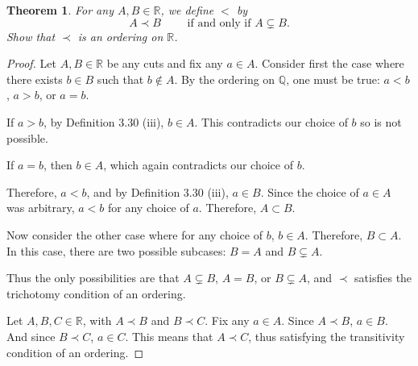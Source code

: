 \documentclass{amsart}
\newtheorem{theorem}{Theorem}
\newcommand{\Q}{\mathbb Q}
\newcommand{\R}{\mathbb R}
\newcommand{\1}{\mathds{1}}
\def \R {{\mathbb {R}}}
\numberwithin{equation}{section}
\numberwithin{theorem}{section}
\begin{document}
\begin{theorem}
	For any $A, B\in \R$, we define $<$ by
	\[
	A \prec B
	\qquad\text{ if and only if }
	A \subsetneq B.
	\]
	Show that $\prec$ is an ordering on $\R$.
\end{theorem}

\begin{proof}
	Let $A,B \in\R$ be any cuts and fix any $a\in A$. Consider first the case where there exists $b\in B$ such that $b\notin A$. By the ordering on $\Q$, one must be true: $a<b$, $a>b$, or $a=b$.
	
	If $a>b$, by Definition 3.30 (iii), $b\in A$. This contradicts our choice of $b$ so is not possible.
	
	If $a = b$, then $b\in A$, which again contradicts our choice of $b$.  
	
	Therefore, $a<b$, and by Definition 3.30 (iii), $a\in B$. Since the choice of $a\in A$ was arbitrary, $a<b$ for any choice of $a$. Therefore, $A\subset B$.
	
	Now consider the other case where for any choice of $b$, $b\in A$. Therefore, $B\subset A$. In this case, there are two possible subcases: $B=A$ and $B\subsetneq A$.
	
	Thus the only possibilities are that $A\subsetneq B$, $A = B$, or $B\subsetneq A$, and $\prec$ satisfies the trichotomy condition of an ordering.
	
	Let $A,B,C\in \R$, with $A\prec B$ and $B\prec C$. Fix any $a\in A$. Since $A\prec B$, $a\in B$. And since $B\prec C$, $a\in C$. This means that $A\prec C$, thus satisfying the transitivity condition of an ordering.
	
	
	
	
\end{proof}
\end{document}
